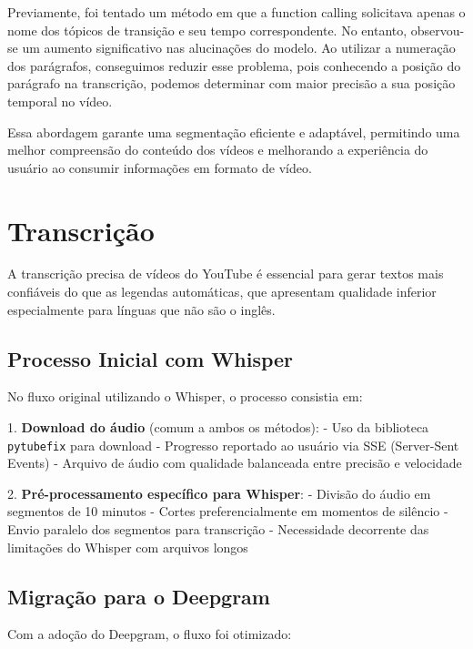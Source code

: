 \documentclass[tcc,capa]{texufpel}
\begin{document}
Previamente, foi tentado um m\'etodo em que a function calling solicitava apenas o nome dos t\'opicos de transi\c{c}\~{a}o e seu tempo correspondente. No entanto, observou-se um aumento significativo nas alucina\c{c}\~{o}es do modelo. Ao utilizar a numera\c{c}\~{a}o dos par\'{a}grafos, conseguimos reduzir esse problema, pois conhecendo a posi\c{c}\~{a}o do par\'{a}grafo na transcri\c{c}\~{a}o, podemos determinar com maior precis\~{a}o a sua posi\c{c}\~{a}o temporal no v\'{i}deo.

Essa abordagem garante uma segmenta\c{c}\~{a}o eficiente e adapt\'avel, permitindo uma melhor compreens\~{a}o do conte\'udo dos v\'{i}deos e melhorando a experi\^{e}ncia do usu\'ario ao consumir informa\c{c}\~{o}es em formato de v\'{i}deo.





\section{Transcrição}

A transcrição precisa de vídeos do YouTube é essencial para gerar textos mais confiáveis do que as legendas automáticas, que apresentam qualidade inferior especialmente para línguas que não são o inglês.

\subsection{Processo Inicial com Whisper}

No fluxo original utilizando o Whisper, o processo consistia em:

1. \textbf{Download do áudio} (comum a ambos os métodos):
   - Uso da biblioteca \texttt{pytubefix} para download
   - Progresso reportado ao usuário via SSE (Server-Sent Events)
   - Arquivo de áudio com qualidade balanceada entre precisão e velocidade

2. \textbf{Pré-processamento específico para Whisper}:
   - Divisão do áudio em segmentos de 10 minutos
   - Cortes preferencialmente em momentos de silêncio
   - Envio paralelo dos segmentos para transcrição
   - Necessidade decorrente das limitações do Whisper com arquivos longos

\subsection{Migração para o Deepgram}

Com a adoção do Deepgram, o fluxo foi otimizado:
\end{document}
